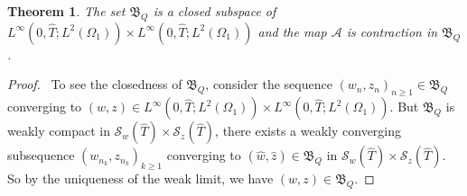 \documentclass[11pt]{article}
\newtheorem{theorem}{Theorem}[section]
\begin{document}
\begin{theorem}\label{contraction_thm}
The set $\mathfrak{B}_Q$ is a closed subspace of $L^{\infty}(0,\widehat{T}; L^2(\Omega_1))\times L^{\infty}(0,\widehat{T}; L^2(\Omega_1))$ and the map $\mathcal{A}$ is contraction in $\mathfrak{B}_Q$.
\end{theorem}
\begin{proof}~To see the closedness of $\mathfrak{B}_Q$, consider the sequence $(w_n, z_n)_{n\geq 1}\in\mathfrak{B}_Q$ converging to $(w,z)\in L^{\infty}(0,\widehat{T}; L^2(\Omega_1))\times L^{\infty}(0,\widehat{T}; L^2(\Omega_1))$. But $\mathfrak{B}_Q$ is weakly compact in $\mathcal{S}_w(\widehat{T})\times\mathcal{S}_z(\widehat{T})$, there exists a weakly converging subsequence $(w_{n_k}, z_{n_k})_{k\geq 1}$ converging to $(\hat{w}, \hat{z})\in\mathfrak{B}_Q$ in $\mathcal{S}_w(\widehat{T})\times\mathcal{S}_z(\widehat{T})$. So by the uniqueness of the weak limit, we have $(w,z)\in\mathfrak{B}_Q$.



\end{proof}
\end{document}
